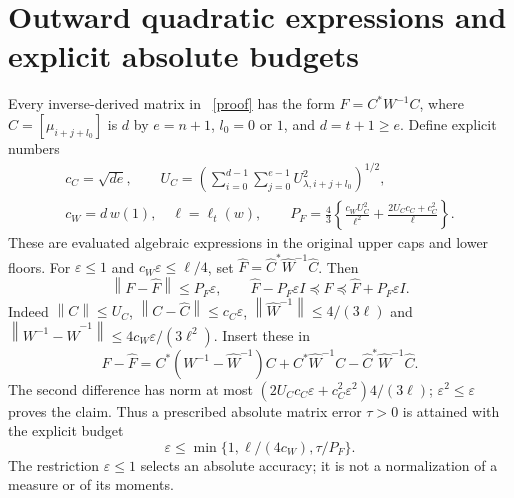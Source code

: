\documentclass[11pt]{article}
\newcommand{\norm}[1]{\left\lVert#1\right\rVert}
\begin{document}
\section{Outward quadratic expressions and explicit absolute budgets}

Every inverse-derived matrix in \cite{FM}%
~\href{https://github.com/KokunoYumeto/zeta-function-research-reader/blob/5992ad50c0f2a06921f1fcaded7b4e38097c0739/workbenches/splitzero-tandem/continuations/20260920-original-kernel-mixed-determinants/providers/NATIVE_RESOLVENT_MOMENT_ENCLOSURES.tex\#L1}{[proof]}%
{} has the form
$F=C^*W^{-1}C$, where $C=[\mu_{i+j+l_0}]$ is $d$ by $e=n+1$,
$l_0=0$ or $1$, and $d=t+1\ge e$. Define explicit numbers
\begin{equation}\label{eq:P}
 \begin{gathered}
 c_C=\sqrt{de},\qquad
 U_C=\left(\sum_{i=0}^{d-1}\sum_{j=0}^{e-1}
                     U_{\lambda,i+j+l_0}^{2}\right)^{1/2},\\
 c_W=d\,w(1),\quad \ell=\ell_t(w),\qquad
 P_F=\frac43\left\{\frac{c_WU_C^2}{\ell^2}
                  +\frac{2U_Cc_C+c_C^2}{\ell}\right\}.
 \end{gathered}
\end{equation}
These are evaluated algebraic expressions in the original upper
caps and lower floors. For $\varepsilon\le1$ and
$c_W\varepsilon\le\ell/4$, set
$\widehat F=\widehat C^*\widehat W^{-1}\widehat C$.
Then
\begin{equation}\label{eq:Ferror}
 \norm{F-\widehat F}\le P_F\varepsilon,
 \qquad \widehat F-P_F\varepsilon I\preceq F
 \preceq\widehat F+P_F\varepsilon I.
\end{equation}
Indeed $\norm{C}\le U_C$, $\norm{C-\widehat C}\le c_C\varepsilon$,
$\norm{\widehat W^{-1}}\le4/(3\ell)$ and
$\norm{W^{-1}-\widehat W^{-1}}\le4c_W\varepsilon/(3\ell^2)$.
Insert these in
\[
 F-\widehat F=C^*(W^{-1}-\widehat W^{-1})C
              +C^*\widehat W^{-1}C-
                    \widehat C^*\widehat W^{-1}\widehat C.
\]
The second difference has norm at most
$(2U_Cc_C\varepsilon+c_C^2\varepsilon^2)4/(3\ell)$;
$\varepsilon^2\le\varepsilon$ proves the claim. Thus a prescribed
absolute matrix error $\tau>0$ is attained with the explicit budget
\begin{equation}\label{eq:budgetF}
 \varepsilon\le\min\{1,\ell/(4c_W),\tau/P_F\}.
\end{equation}
The restriction $\varepsilon\le1$ selects an absolute accuracy;
it is not a normalization of a measure or of its moments.
\end{document}
